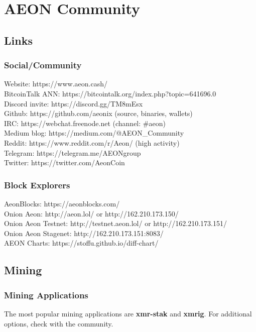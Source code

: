 \section{AEON Community}

\subsection{Links}
\subsubsection{Social/Community}
Website:		https://www.aeon.cash/ \\
BitcoinTalk ANN:	https://bitcointalk.org/index.php?topic=641696.0\\
Discord invite:		https://discord.gg/TM8mEsx \\
Github:			https://github.com/aeonix		(source, binaries, wallets)\\
IRC:			https://webchat.freenode.net 		(channel:  \#aeon)\\
Medium blog:		https://medium.com/@AEON\_Community \\
Reddit:			https://www.reddit.com/r/Aeon/	(high activity)\\
Telegram:		https://telegram.me/AEONgroup\\
Twitter:			https://twitter.com/AeonCoin\\

\subsubsection{Block Explorers}
AeonBlocks:		https://aeonblocks.com/ \\
Onion Aeon:		http://aeon.lol/ or http://162.210.173.150/ \\
Onion Aeon Testnet:	http://testnet.aeon.lol/ or http://162.210.173.151/ \\
Onion Aeon Stagenet:	http://162.210.173.151:8083/ \\
AEON Charts:		https://stoffu.github.io/diff-chart/ \\

\subsection{Mining}
\subsubsection{Mining Applications}
The most popular mining applications are \textbf{xmr-stak} and \textbf{xmrig}.  For additional options, check with the community.

